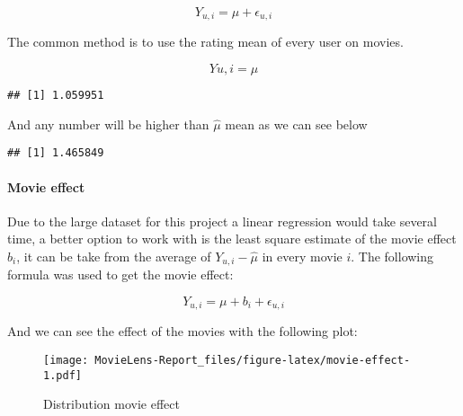 \documentclass[
]{article}
\newenvironment{Shaded}{\begin{snugshade}}{\end{snugshade}}
\newcommand{\FloatTok}[1]{\textcolor[rgb]{0.00,0.00,0.81}{#1}}
\newcommand{\FunctionTok}[1]{\textcolor[rgb]{0.13,0.29,0.53}{\textbf{#1}}}
\newcommand{\NormalTok}[1]{#1}
\newcommand{\OtherTok}[1]{\textcolor[rgb]{0.56,0.35,0.01}{#1}}
\newcommand{\SpecialCharTok}[1]{\textcolor[rgb]{0.81,0.36,0.00}{\textbf{#1}}}
\begin{document}
\[Y_{u,i}=\mu+\epsilon_{u,i}\]

The common method is to use the rating mean of every user on movies.

\[Y{u,i} = \mu\]

\begin{Shaded}
\end{Shaded}

\begin{verbatim}
## [1] 1.059951
\end{verbatim}

And any number will be higher than \(\hat{\mu}\) mean as we can see
below

\begin{Shaded}
\end{Shaded}

\begin{verbatim}
## [1] 1.465849
\end{verbatim}

\hypertarget{movie-effect}{%
\paragraph{Movie effect}\label{movie-effect}}

Due to the large dataset for this project a linear regression would take
several time, a better option to work with is the least square estimate
of the movie effect \(\hat{b}_i\), it can be take from the average of
\(Y_{u,i}-\hat{\mu}\) in every movie \(i\). The following formula was
used to get the movie effect:

\[Y_{u,i}=\mu+b_i+\epsilon_{u,i}\]

And we can see the effect of the movies with the following plot:

\begin{figure}
\centering
\texttt{[image: MovieLens-Report\_files/figure-latex/movie-effect-1.pdf]}
\caption{Distribution movie effect}
\end{figure}
\end{document}

